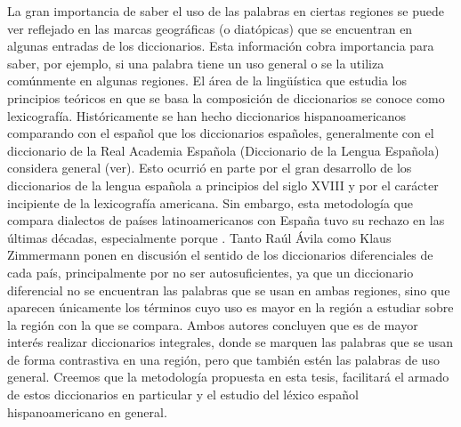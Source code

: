 La gran importancia de saber el uso de las palabras en ciertas regiones se puede ver reflejado en las marcas geográficas (o diatópicas) que se encuentran en algunas entradas de los diccionarios. Esta información cobra importancia para saber, por ejemplo, si una palabra tiene un uso general o se la utiliza comúnmente en algunas regiones. El área de la lingüística que estudia los principios teóricos en que se basa la composición de diccionarios se conoce como lexicografía. Históricamente se han hecho diccionarios hispanoamericanos comparando con el español que los diccionarios españoles, generalmente con el diccionario de la Real Academia Española (Diccionario de la Lengua Española) considera general (ver\cite {zimmermann2006fin}). Esto ocurrió en parte por el gran desarrollo de los diccionarios de la lengua española a principios del siglo XVIII y por el carácter incipiente de la lexicografía americana. Sin embargo, esta metodología que compara dialectos de países latinoamericanos con España tuvo su rechazo en las últimas décadas, especialmente porque . Tanto Raúl Ávila como Klaus Zimmermann ponen en discusión el sentido de los diccionarios diferenciales de cada país, principalmente por no ser autosuficientes, ya que un diccionario diferencial no se encuentran las palabras que se usan en ambas regiones, sino que aparecen únicamente los términos cuyo uso es mayor en la región a estudiar sobre la región con la que se compara. Ambos autores concluyen que es de mayor interés realizar diccionarios integrales, donde se marquen las palabras que se usan de forma contrastiva en una región, pero que también estén las palabras de uso general. Creemos que la metodología propuesta en esta tesis, facilitará el armado de estos diccionarios en particular y el estudio del léxico español hispanoamericano en general.\\




